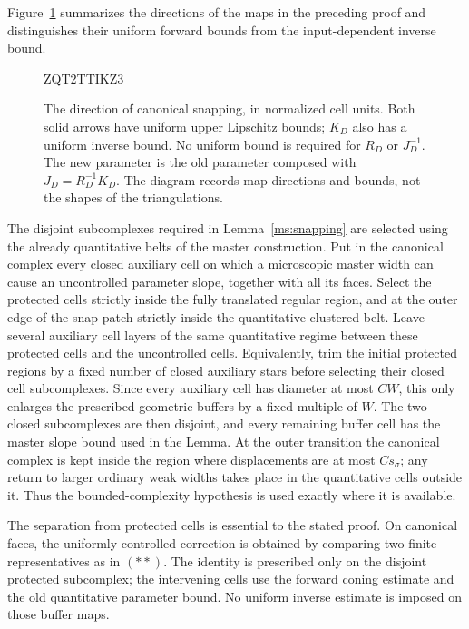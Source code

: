 \documentclass[11pt]{article}
\numberwithin{equation}{section}
\theoremstyle{definition}
\theoremstyle{remark}
\begin{document}
Figure~\ref{ms:fig-snapping} summarizes the directions of the maps
in the preceding proof and distinguishes their uniform forward
bounds from the input-dependent inverse bound.

\begin{figure}[htbp]

ZQT2TTIKZ3
\caption{The direction of canonical snapping, in normalized cell units.
Both solid arrows have uniform upper Lipschitz bounds; $K_D$ also has
a uniform inverse bound.  No uniform bound is required for
$R_D$ or $J_D^{-1}$.  The new parameter is the old parameter composed
with $J_D=R_D^{-1}K_D$.  The diagram records map directions and bounds,
not the shapes of the triangulations.}
\label{ms:fig-snapping}
\end{figure}

The disjoint subcomplexes required in
Lemma~\ref{ms:snapping} are selected using the already quantitative
belts of the master construction.  Put in the canonical complex
every closed auxiliary cell on which a microscopic master width
can cause an uncontrolled parameter slope, together with all its
faces.  Select the protected cells strictly inside the fully
translated regular region, and at the outer edge of the snap patch
strictly inside the quantitative clustered belt.  Leave several
auxiliary cell layers of the same quantitative regime between
these protected cells and the uncontrolled cells.  Equivalently,
trim the initial protected regions by a fixed number of closed
auxiliary stars before selecting their closed cell subcomplexes.
Since every auxiliary cell has diameter at most $C W$, this only
enlarges the prescribed geometric buffers by a fixed multiple of
$W$.  The two closed subcomplexes are then disjoint, and every
remaining buffer cell has the master slope bound used in the
Lemma.  At the outer transition the canonical complex is kept
inside the region where displacements are at most $C s_\sigma$;
any return to larger ordinary weak widths takes place in the
quantitative cells outside it.  Thus the bounded-complexity
hypothesis is used exactly where it is available.

The separation from protected cells is essential to the stated
proof.  On canonical faces, the uniformly controlled correction
is obtained by comparing two finite representatives as in $(**)$.
The identity is prescribed only on the disjoint protected
subcomplex; the intervening cells use the forward coning estimate
and the old quantitative parameter bound.  No uniform inverse
estimate is imposed on those buffer maps.
\end{document}

